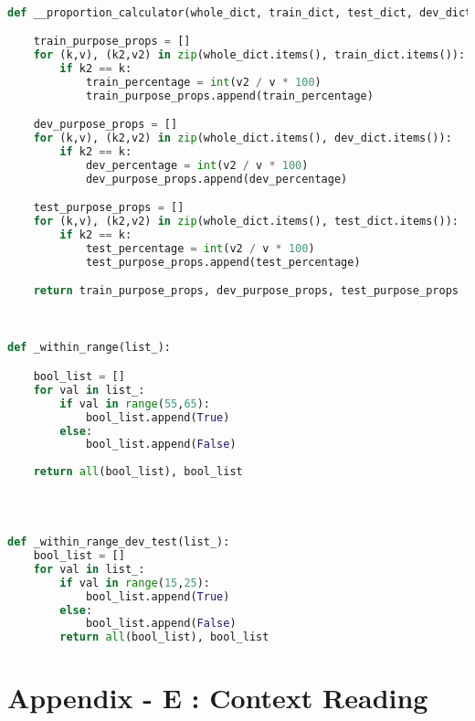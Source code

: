 \begin{lstlisting}[language=python,frame=tb,caption={Function to determine the proportion of each class label in the split data sets of train, test and development},label=lst:useless]

def __proportion_calculator(whole_dict, train_dict, test_dict, dev_dict ):

	train_purpose_props = []
	for (k,v), (k2,v2) in zip(whole_dict.items(), train_dict.items()):
		if k2 == k: 
			train_percentage = int(v2 / v * 100)
			train_purpose_props.append(train_percentage)

	dev_purpose_props = []
	for (k,v), (k2,v2) in zip(whole_dict.items(), dev_dict.items()):
		if k2 == k:
			dev_percentage = int(v2 / v * 100)
			dev_purpose_props.append(dev_percentage)

	test_purpose_props = []       
	for (k,v), (k2,v2) in zip(whole_dict.items(), test_dict.items()):
		if k2 == k:
			test_percentage = int(v2 / v * 100)
			test_purpose_props.append(test_percentage)

	return train_purpose_props, dev_purpose_props, test_purpose_props

\end{lstlisting}


\begin{lstlisting}[language=python,frame=tb,caption={Check if the data split is within +/- 5\%  for training set},label=lst:useless]


def _within_range(list_):

	bool_list = []
	for val in list_:
		if val in range(55,65):
			bool_list.append(True)
		else:
			bool_list.append(False)
			
	return all(bool_list), bool_list
	

\end{lstlisting}

\begin{lstlisting}[language=python,frame=tb,caption={Check if the data split is within +/- 5\%  for test and developments set},label=lst:useless]


def _within_range_dev_test(list_):
	bool_list = []
	for val in list_:
		if val in range(15,25):
			bool_list.append(True)
		else:
			bool_list.append(False)
		return all(bool_list), bool_list 

\end{lstlisting}





\chapter{Appendix - E : Context Reading}
\label{ch:datasplit}

